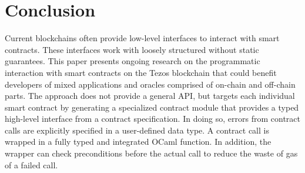 \documentclass[a4paper,USenglish,american,cleveref, autoref, thm-restate]{oasics-v2021}
\begin{document}
\section{Conclusion}
\label{sec:conclusion}

Current blockchains often provide low-level interfaces to interact
with smart contracts. These interfaces work with loosely structured
without static guarantees. This paper presents ongoing research on the
programmatic interaction with smart contracts on the Tezos blockchain
that could benefit developers of mixed applications and
oracles comprised of on-chain and off-chain parts. The approach does
not provide a general API, but targets each 
individual smart contract by generating a specialized contract module
that provides a typed high-level interface from a contract
specification. In doing so, errors from contract calls are explicitly
specified in a user-defined data type. A contract call is wrapped in a
fully typed and integrated OCaml function. In addition, the wrapper can check preconditions before the 
actual call to reduce the waste of gas of a failed call.






\end{document}

